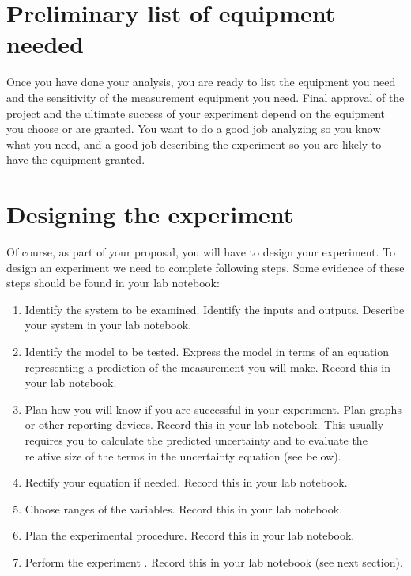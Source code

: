 \section{Preliminary list of equipment needed}

Once you have done your analysis, you are ready to list the equipment you
need and the sensitivity of the measurement equipment you need. Final
approval of the project and the ultimate success of your experiment depend
on the equipment you choose or are granted. You want to do a good job
analyzing so you know what you need, and a good job describing the
experiment so you are likely to have the equipment granted.

\section{Designing the experiment}

Of course, as part of your proposal, you will have to design your
experiment. To design an experiment we need to complete
following steps. Some evidence of these steps should be found in your lab
notebook:

\begin{enumerate}
\item Identify the system to be examined. Identify the inputs and outputs.
Describe your system in your lab notebook.

\item Identify the model to be tested. Express the model in terms of an
equation representing a prediction of the measurement you will make. Record
this in your lab notebook.

\item Plan how you will know if you are successful in your experiment. Plan
graphs or other reporting devices. Record this in your lab notebook. This
usually requires you to calculate the predicted uncertainty and to evaluate
the relative size of the terms in the uncertainty equation (see below).

\item Rectify your equation if needed. Record this in your lab notebook.

\item Choose ranges of the variables. Record this in your lab notebook.

\item Plan the experimental procedure. Record this in your lab notebook.

\item Perform the experiment . Record this in your lab notebook (see next
section).
\end{enumerate}

